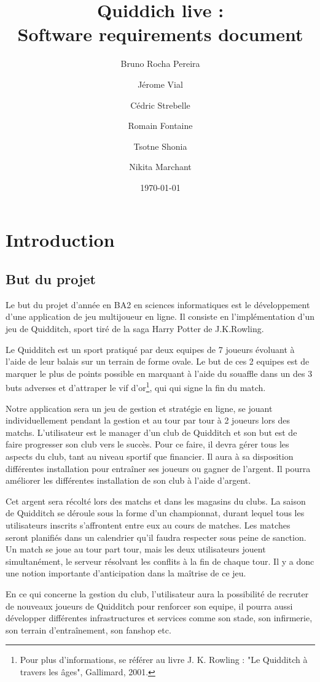 \documentclass[a4paper]{article}
\title{Quiddich live : \\Software requirements document}
\author{Bruno Rocha Pereira \and Jérome Vial \and Cédric Strebelle \and
Romain Fontaine \and Tsotne Shonia \and Nikita Marchant}
\date{\today}
\begin{document}
\maketitle

\section{Introduction}
\subsection{But du projet}
Le but du projet d'année en BA2 en sciences informatiques est le développement d'une application de jeu multijoueur en ligne.
Il consiste en l'implémentation d'un jeu de Quidditch, sport tiré de la saga Harry Potter de J.K.Rowling.

 
Le Quidditch est un sport pratiqué par deux \glspl{equipe} de 7 \glspl{joueur} évoluant à l'aide de leur balais sur un terrain de forme ovale. Le but de ces 2 \glspl{equipe} est de marquer le plus de points possible en marquant à l'aide du souaffle dans un des 3 buts adverses et d'attraper le vif d'or\footnote{Pour plus d'informations, se référer au livre J. K. Rowling : "Le Quidditch à travers les âges", Gallimard, 2001.}, qui qui signe la fin du match. 


Notre application sera un jeu de gestion et stratégie en ligne, se jouant individuellement pendant la gestion et au tour par tour à 2 joueurs lors des matchs. L'\gls{utilisateur} est le \gls{manager} d'un \gls{club} de Quidditch et son but est de faire progresser son \gls{club} vers le succès. Pour ce faire, il devra gérer tous les aspects du \gls{club}, tant au niveau sportif que financier. Il aura à sa disposition différentes installation pour entraîner ses \glspl{joueur} ou gagner de l'argent. Il pourra améliorer les différentes installation de son \gls{club} à l'aide d'argent.

Cet argent sera récolté lors des matchs et dans les magasins du \glspl{club}. La saison de Quidditch se déroule sous la forme d'un championnat, durant lequel tous les \glspl{utilisateur} inscrits s'affrontent entre eux au cours de matches. Les matches seront planifiés dans un calendrier qu'il faudra respecter sous peine de sanction. Un match se joue au tour part tour, mais les deux \glspl{utilisateur} jouent simultanément, le \gls{serveur} résolvant les conflits à la fin de chaque tour. Il y a donc une notion importante d'anticipation dans la maîtrise de ce jeu.

En ce qui concerne la gestion du \gls{club}, l'\gls{utilisateur} aura la possibilité de recruter de nouveaux \glspl{joueur} de Quidditch pour renforcer son \gls{equipe}, il pourra aussi développer différentes infrastructures et services comme son stade, son infirmerie, son terrain d'entraînement, son fanshop etc.
\end{document}
